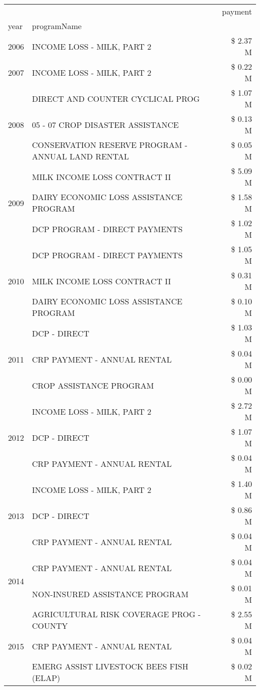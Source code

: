 \begin{tabular}{llr}
\toprule
 &  & payment \\
year & programName &  \\
\midrule
2006 & INCOME LOSS - MILK, PART 2 & \$ 2.37 M \\
\cline{1-3}
2007 & INCOME LOSS - MILK, PART 2 & \$ 0.22 M \\
\cline{1-3}
\multirow[t]{3}{*}{2008} & DIRECT AND COUNTER CYCLICAL PROG & \$ 1.07 M \\
 & 05 - 07 CROP DISASTER ASSISTANCE & \$ 0.13 M \\
 & CONSERVATION RESERVE PROGRAM - ANNUAL LAND RENTAL & \$ 0.05 M \\
\cline{1-3}
\multirow[t]{3}{*}{2009} & MILK INCOME LOSS CONTRACT II & \$ 5.09 M \\
 & DAIRY ECONOMIC LOSS ASSISTANCE PROGRAM & \$ 1.58 M \\
 & DCP PROGRAM - DIRECT PAYMENTS & \$ 1.02 M \\
\cline{1-3}
\multirow[t]{3}{*}{2010} & DCP PROGRAM - DIRECT PAYMENTS & \$ 1.05 M \\
 & MILK INCOME LOSS CONTRACT II & \$ 0.31 M \\
 & DAIRY ECONOMIC LOSS ASSISTANCE PROGRAM & \$ 0.10 M \\
\cline{1-3}
\multirow[t]{3}{*}{2011} & DCP - DIRECT & \$ 1.03 M \\
 & CRP PAYMENT - ANNUAL RENTAL & \$ 0.04 M \\
 & CROP ASSISTANCE PROGRAM & \$ 0.00 M \\
\cline{1-3}
\multirow[t]{3}{*}{2012} & INCOME LOSS - MILK, PART 2 & \$ 2.72 M \\
 & DCP - DIRECT & \$ 1.07 M \\
 & CRP PAYMENT - ANNUAL RENTAL & \$ 0.04 M \\
\cline{1-3}
\multirow[t]{3}{*}{2013} & INCOME LOSS - MILK, PART 2 & \$ 1.40 M \\
 & DCP - DIRECT & \$ 0.86 M \\
 & CRP PAYMENT - ANNUAL RENTAL & \$ 0.04 M \\
\cline{1-3}
\multirow[t]{2}{*}{2014} & CRP PAYMENT - ANNUAL RENTAL & \$ 0.04 M \\
 & NON-INSURED ASSISTANCE PROGRAM & \$ 0.01 M \\
\cline{1-3}
\multirow[t]{3}{*}{2015} & AGRICULTURAL RISK COVERAGE PROG - COUNTY & \$ 2.55 M \\
 & CRP PAYMENT - ANNUAL RENTAL & \$ 0.04 M \\
 & EMERG ASSIST LIVESTOCK BEES FISH (ELAP) & \$ 0.02 M \\

\end{tabular}
